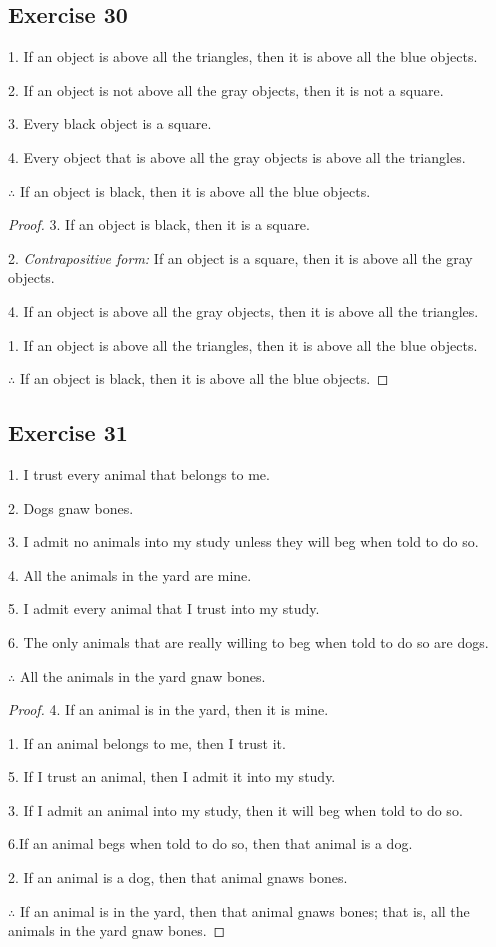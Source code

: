 \documentclass[14pt]{extarticle}
\begin{document}
\subsection{Exercise 30}
1. If an object is above all the triangles, then it is above all the blue objects.

2. If an object is not above all the gray objects, then it is not a square.

3. Every black object is a square.

4. Every object that is above all the gray objects is above all the triangles.

$\therefore$ If an object is black, then it is above all the blue objects.

\begin{proof}
3. If an object is black, then it is a square.

2. {\it Contrapositive form:} If an object is a square, then it is above all the gray objects.

4. If an object is above all the gray objects, then it is above all the triangles.

1. If an object is above all the triangles, then it is above all the blue objects.

$\therefore$ If an object is black, then it is above all the blue objects.
\end{proof}

\subsection{Exercise 31}
1. I trust every animal that belongs to me.

2. Dogs gnaw bones.

3. I admit no animals into my study unless they will beg when told to do so.

4. All the animals in the yard are mine.

5. I admit every animal that I trust into my study.

6. The only animals that are really willing to beg when told to do so are dogs.

$\therefore$ All the animals in the yard gnaw bones.

\begin{proof}
4. If an animal is in the yard, then it is mine.

1. If an animal belongs to me, then I trust it.

5. If I trust an animal, then I admit it into my study. 

3. If I admit an animal into my study, then it will beg when told to do so.

6.If an animal begs when told to do so, then that animal is a dog.

2. If an animal is a dog, then that animal gnaws bones.

$\therefore$ If an animal is in the yard, then that animal gnaws bones; that is, all the animals in the yard gnaw bones.
\end{proof}
\end{document}
